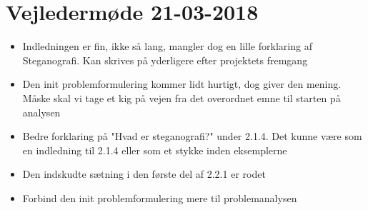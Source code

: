 \newpage
\section{Vejledermøde 21-03-2018}
\begin{itemize}
    \item Indledningen er fin, ikke så lang, mangler dog en lille forklaring af Steganografi. Kan skrives på yderligere efter projektets fremgang
    \item Den init problemformulering kommer lidt hurtigt, dog giver den mening. Måske skal vi tage et kig på vejen fra det overordnet emne til starten på analysen
    \item Bedre forklaring på "Hvad er steganografi?" under 2.1.4. Det kunne være som en indledning til 2.1.4 eller som et stykke inden eksemplerne
    \item Den indskudte sætning i den første del af 2.2.1 er rodet
    \item Forbind den init problemformulering mere til problemanalysen
\end{itemize}